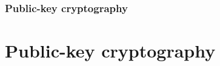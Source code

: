 \section{Public-key cryptography}
\part{Public-key cryptography}
\begin{frame}
	\partpage
	\centering
\end{frame}

